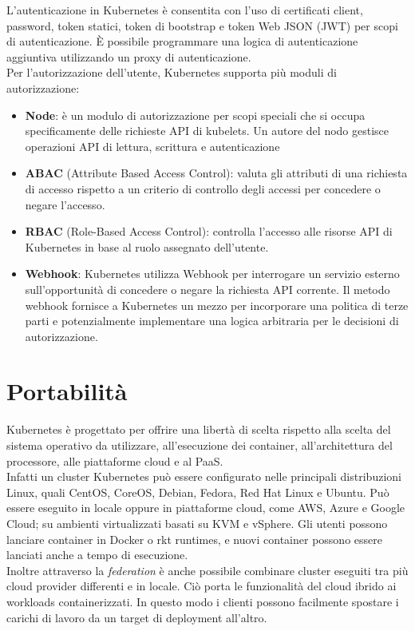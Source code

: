 \documentclass[12pt, a4paper]{report}
\begin{document}
L'autenticazione in Kubernetes è consentita con l'uso di certificati client, password, token statici, token di bootstrap e token Web JSON (JWT) per scopi di autenticazione. È possibile programmare una logica di autenticazione aggiuntiva utilizzando un proxy di autenticazione.\\
Per l'autorizzazione dell'utente, Kubernetes supporta più moduli di autorizzazione:
\begin{itemize}
  \item \textbf{Node}: è un modulo di autorizzazione per scopi speciali che si occupa specificamente delle richieste API di kubelets. Un autore del nodo gestisce operazioni API di lettura, scrittura e autenticazione
  \item \textbf{ABAC} (Attribute Based Access Control): valuta gli attributi di una richiesta di accesso rispetto a un criterio di controllo degli accessi per concedere o negare l'accesso.
  \item \textbf{RBAC} (Role-Based Access Control): controlla l'accesso alle risorse API di Kubernetes in base al ruolo assegnato dell'utente.
  \item \textbf{Webhook}:  Kubernetes utilizza Webhook per interrogare un servizio esterno sull'opportunità di concedere o negare la richiesta API corrente. Il metodo webhook fornisce a Kubernetes un mezzo per incorporare una politica di terze parti e potenzialmente implementare una logica arbitraria per le decisioni di autorizzazione.
\end{itemize}
\section{Portabilità}
Kubernetes è progettato per offrire una libertà di scelta rispetto alla scelta del sistema operativo da utilizzare, all'esecuzione dei container, all'architettura del processore, alle piattaforme cloud e al PaaS.\\
Infatti un cluster Kubernetes può essere configurato nelle principali distribuzioni Linux, quali CentOS, CoreOS, Debian, Fedora, Red Hat Linux e Ubuntu. Può essere eseguito in locale oppure in piattaforme cloud, come AWS, Azure e Google Cloud; su ambienti virtualizzati basati su KVM e vSphere. Gli utenti possono lanciare container in Docker o rkt runtimes, e nuovi container possono essere lanciati anche a tempo di esecuzione. \\
Inoltre attraverso la \textit{federation} è anche possibile combinare cluster eseguiti tra più cloud provider differenti e in locale. Ciò porta le funzionalità del cloud ibrido ai workloads containerizzati. In questo modo i clienti possono facilmente spostare i carichi di lavoro da un target di deployment all'altro.
\end{document}
